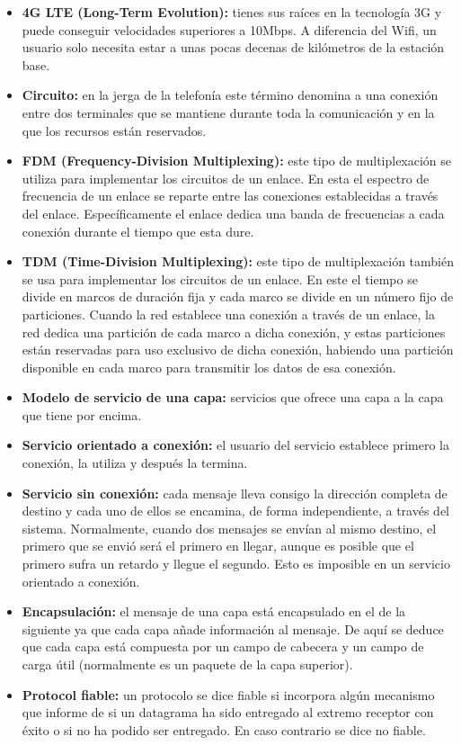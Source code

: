 \documentclass[a4paper,11pt]{article}
\begin{document}
\begin{itemize}
\item \textbf{4G LTE (Long-Term Evolution):} tienes sus raíces en la tecnología 3G y puede conseguir velocidades superiores a 10Mbps. A diferencia del Wifi, un usuario solo necesita estar a unas pocas decenas de kilómetros de la estación base.

\item \textbf{Circuito:} en la jerga de la telefonía este término denomina a una conexión entre dos terminales que se mantiene durante toda la comunicación y en la que los recursos están reservados.

\item \textbf{FDM (Frequency-Division Multiplexing):} este tipo de multiplexación se utiliza para implementar los circuitos de un enlace. En esta el espectro de frecuencia de un enlace se reparte entre las conexiones establecidas a través del enlace. Específicamente el enlace dedica una banda de frecuencias a cada conexión durante el tiempo que esta dure.

\item \textbf{TDM (Time-Division Multiplexing):} este tipo de multiplexación también se usa para implementar los circuitos de un enlace. En este el tiempo se divide en marcos de duración fija y cada marco se divide en un número fijo de particiones. Cuando la red establece una conexión a través de un enlace, la red dedica una partición de cada marco a dicha conexión, y estas particiones están reservadas para uso exclusivo de dicha conexión, habiendo una partición disponible en cada marco para transmitir los datos de esa conexión.

\item \textbf{Modelo de servicio de una capa:} servicios que ofrece una capa a la capa que tiene por encima.

\item \textbf{Servicio orientado a conexión:} el usuario del servicio establece primero la conexión, la utiliza y después la termina. 

\item \textbf{Servicio sin conexión:} cada mensaje lleva consigo la dirección completa de destino y cada uno de ellos se encamina, de forma independiente, a través del sistema. Normalmente, cuando dos mensajes se envían al mismo destino, el primero que se envió será el primero en llegar, aunque es posible que el primero sufra un retardo y llegue el segundo. Esto es imposible en un servicio orientado a conexión. 

\item \textbf{Encapsulación:} el mensaje de una capa está encapsulado en el de la siguiente ya que cada capa añade información al mensaje. De aquí se deduce que cada capa está compuesta por un campo de cabecera y un campo de carga útil (normalmente es un paquete de la capa superior).

\item \textbf{Protocol fiable:} un protocolo se dice fiable si incorpora algún mecanismo que informe de si un datagrama ha sido entregado al extremo receptor con éxito o si no ha podido ser entregado. En caso contrario se dice no fiable.
\end{itemize} 
\end{document}
